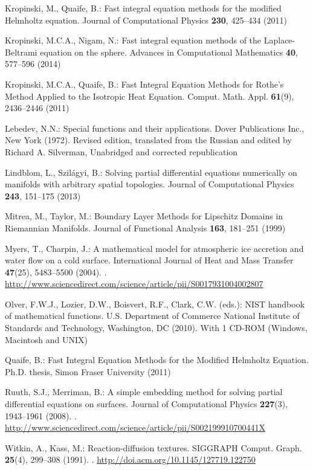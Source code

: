 \begin{thebibliography}{10}
Kropinski, M., Quaife, B.: Fast integral equation methods for the modified
  {H}elmholtz equation.
\newblock Journal of Computational Physics \textbf{230}, 425--434 (2011)

Kropinski, M.C.A., Nigam, N.: {Fast integral equation methods of the
  Laplace-Beltrami equation on the sphere}.
\newblock Advances in Computational Mathematics \textbf{40}, 577--596 (2014)

Kropinski, M.C.A., Quaife, B.: {Fast Integral Equation Methods for Rothe's
  Method Applied to the Isotropic Heat Equation}.
\newblock Comput. Math. Appl. \textbf{61}(9), 2436--2446 (2011)

Lebedev, N.N.: Special functions and their applications.
\newblock Dover Publications Inc., New York (1972).
\newblock Revised edition, translated from the Russian and edited by Richard A.
  Silverman, Unabridged and corrected republication

Lindblom, L., Szil\'{a}gyi, B.: {Solving partial differential equations
  numerically on manifolds with arbitrary spatial topologies}.
\newblock Journal of Computational Physics \textbf{243}, 151--175 (2013)

Mitrea, M., Taylor, M.: {Boundary Layer Methods for Lipschitz Domains in
  Riemannian Manifolds}.
\newblock Journal of Functional Analysis \textbf{163}, 181--251 (1999)

Myers, T., Charpin, J.: A mathematical model for atmospheric ice accretion and
  water flow on a cold surface.
\newblock International Journal of Heat and Mass Transfer \textbf{47}(25),
  5483--5500 (2004).
\newblock {}.
\newblock
  \urlprefix\url{http://www.sciencedirect.com/science/article/pii/S0017931004002807}

Olver, F.W.J., Lozier, D.W., Boisvert, R.F., Clark, C.W. (eds.): N{IST}
  handbook of mathematical functions.
\newblock U.S. Department of Commerce National Institute of Standards and
  Technology, Washington, DC (2010).
\newblock With 1 CD-ROM (Windows, Macintosh and UNIX)

Quaife, B.: {Fast Integral Equation Methods for the Modified Helmholtz
  Equation}.
\newblock Ph.D. thesis, Simon Fraser University (2011)

Ruuth, S.J., Merriman, B.: A simple embedding method for solving partial
  differential equations on surfaces.
\newblock Journal of Computational Physics \textbf{227}(3), 1943--1961 (2008).
\newblock {}.
\newblock
  \urlprefix\url{http://www.sciencedirect.com/science/article/pii/S002199910700441X}

Witkin, A., Kass, M.: Reaction-diffusion textures.
\newblock SIGGRAPH Comput. Graph. \textbf{25}(4), 299--308 (1991).
\newblock {}.
\newblock \urlprefix\url{http://doi.acm.org/10.1145/127719.122750}

\end{thebibliography}





